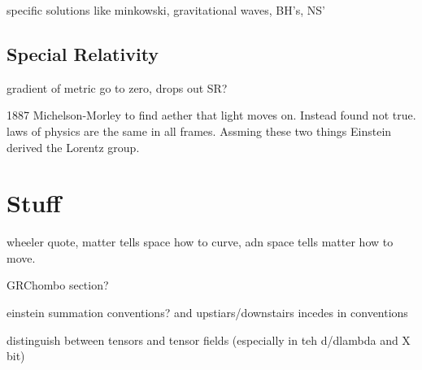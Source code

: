 specific solutions like minkowski, gravitational waves, BH's, NS'

\subsection{Special Relativity}
gradient of metric go to zero, drops out SR?

1887 Michelson-Morley to find aether that light moves on. Instead found not true. laws of physics are the same in all frames. Assming these two things Einstein derived the Lorentz group.

\section{Stuff}
wheeler quote, matter tells space how to curve, adn space tells matter how to move.

GRChombo section?

einstein summation conventions? and upstiars/downstairs incedes in conventions

distinguish between tensors and tensor fields (especially in teh d/dlambda and X bit)

